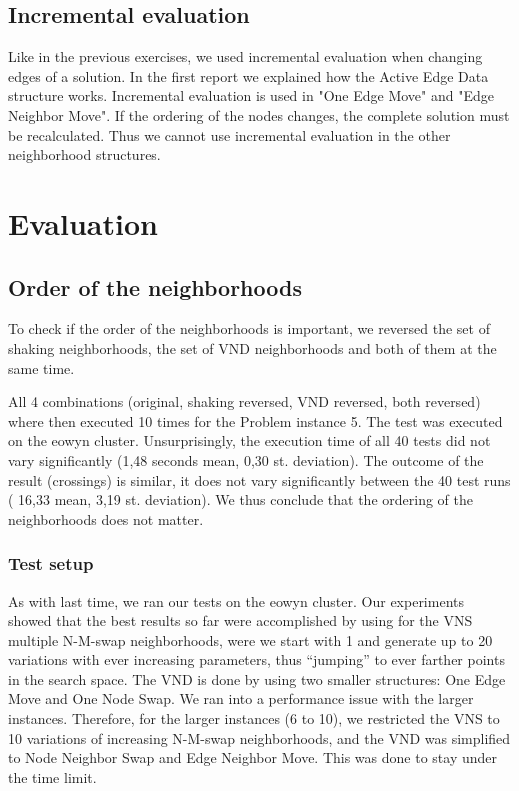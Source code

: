 \documentclass [11pt]{article}
\begin{document}
\subsection{Incremental evaluation}

Like in the previous exercises, we used incremental evaluation when changing edges of a solution. In the first report we explained how the Active Edge Data structure works. Incremental evaluation is used in "One Edge Move" and "Edge Neighbor Move". If the ordering of the nodes changes, the complete solution must be recalculated. Thus we cannot use incremental evaluation in the other neighborhood structures.


\section{Evaluation}

\subsection{Order of the neighborhoods}

To check if the order of the neighborhoods is important, we reversed the set of shaking neighborhoods, the set of VND neighborhoods and both of them at the same time.

All 4 combinations (original, shaking reversed, VND reversed, both reversed) where then executed 10 times for the Problem instance 5. The test was executed on the eowyn cluster. Unsurprisingly, the execution time of all 40 tests did not vary significantly (1,48 seconds mean, 0,30 st. deviation). The outcome of the result (crossings) is similar, it does not vary significantly between the 40 test runs ( 16,33 mean, 3,19 st. deviation). We thus conclude that the ordering of the neighborhoods does not matter.

\subsubsection{Test setup}
As with last time, we ran our tests on the eowyn cluster. Our experiments showed that the best results so far were accomplished by using for the VNS multiple N-M-swap neighborhoods, were we start with 1 and generate up to 20 variations with ever increasing parameters, thus ``jumping'' to ever farther points in the search space. The VND is done by using two smaller structures:  One Edge Move and One Node Swap. We ran into a performance issue with the larger instances. Therefore, for the larger instances (6 to 10), we restricted the VNS to 10 variations of increasing N-M-swap neighborhoods, and the VND was simplified to Node Neighbor Swap and Edge Neighbor Move. This was done to stay under the time limit. 
\end{document}
